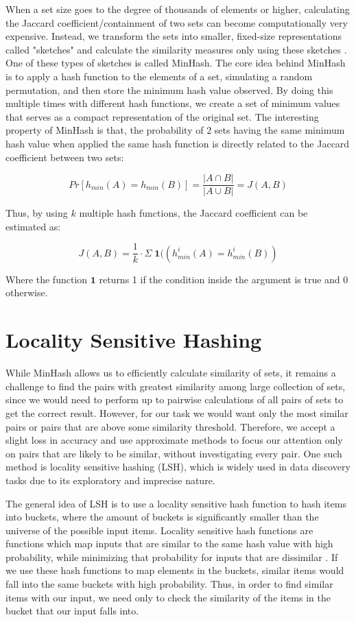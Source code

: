When a set size goes to the degree of thousands of elements or higher, calculating the Jaccard coefficient/containment of two sets can become computationally very expensive. Instead, we transform the sets into smaller, fixed-size representations called "sketches" and calculate the similarity measures only using these sketches \cite{miningOfMassiveDatasets}. One of these types of sketches is called MinHash. The core idea behind MinHash is to apply a hash function to the elements of a set, simulating a random permutation, and then store the minimum hash value observed. By doing this multiple times with different hash functions, we create a set of minimum values that serves as a compact representation of the original set. The interesting property of MinHash is that, the probability of 2 sets having the same minimum hash value when applied the same hash function is directly related to the Jaccard coefficient between two sets:

\[Pr[h_{min}(A) = h_{min}(B)] = \frac{|A \cap B|}{|A \cup B|} = J(A, B)\]

Thus, by using \(k\) multiple hash functions, the Jaccard coefficient can be estimated as:

\[J(A, B) = \frac{1}{k} \cdot \Sigma \; \mathbf{1}((h^i_{min}(A) = h^i_{min}(B))\]

Where the function \(\mathbf{1}\) returns 1 if the condition inside the argument is true and 0 otherwise.

\section{Locality Sensitive Hashing} \label{lsh}

While MinHash allows us to efficiently calculate similarity of sets, it remains a challenge to find the pairs with greatest similarity among large collection of sets, since we would need to perform up to pairwise calculations of all pairs of sets to get the correct result. However, for our task we would want only the most similar pairs or pairs that are above some similarity threshold. Therefore, we accept a slight loss in accuracy and use approximate methods to focus our attention only on pairs that are likely to be similar, without investigating every pair. One such method is locality sensitive hashing (LSH), which is widely used in data discovery tasks due to its exploratory and imprecise nature. \cite{miningOfMassiveDatasets, lazo}

The general idea of LSH is to use a locality sensitive hash function to hash items into buckets, where the amount of buckets is significantly smaller than the universe of the possible input items. Locality sensitive hash functions are functions which map inputs that are similar to the same hash value with high probability, while minimizing that probability for inputs that are dissimilar \cite{lshDefinition}. If we use these hash functions to map elements in the buckets, similar items would fall into the same buckets with high probability. Thus, in order to find similar items with our input, we need only to check the similarity of the items in the bucket that our input falls into. 

